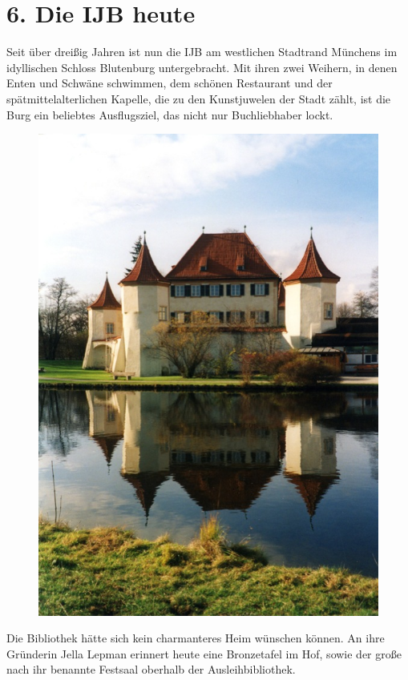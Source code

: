 \documentclass[a4paper,
fontsize=11pt,
oneside,
numbers=noperiodatend,
parskip=half-,
bibliography=totoc,
final
]{scrartcl}
\begin{document}
\section*{6. Die IJB heute}\label{die-ijb-heute}

Seit über dreißig Jahren ist nun die IJB am westlichen Stadtrand
Münchens im idyllischen Schloss Blutenburg untergebracht. Mit ihren zwei
Weihern, in denen Enten und Schwäne schwimmen, dem schönen Restaurant
und der spätmittelalterlichen Kapelle, die zu den Kunstjuwelen der Stadt
zählt, ist die Burg ein beliebtes Ausflugsziel, das nicht nur
Buchliebhaber lockt.~

\begin{figure}[htbp]
\centering
\includegraphics{img/bild14.jpg}
\end{figure}

Die Bibliothek hätte sich kein charmanteres Heim wünschen können. An
ihre Gründerin Jella Lepman erinnert heute eine Bronzetafel im Hof,
sowie der große nach ihr benannte Festsaal oberhalb der
Ausleihbibliothek.
\end{document}
